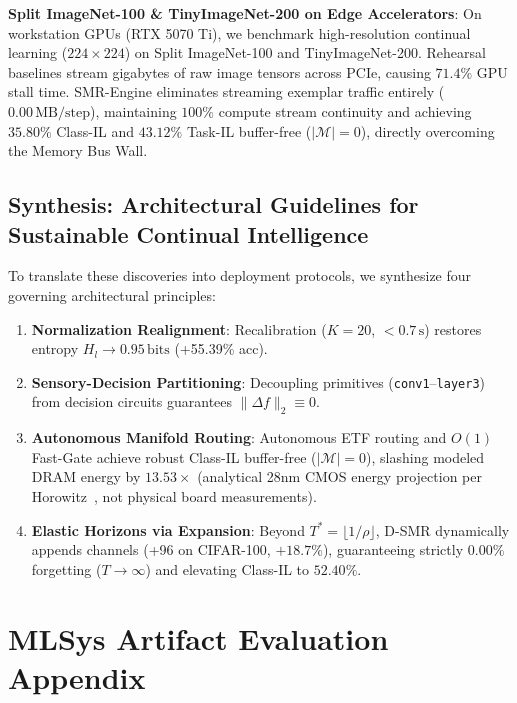 \documentclass{article}
\begin{document}
\noindent\textbf{Split ImageNet-100 \& TinyImageNet-200 on Edge Accelerators}:
On workstation GPUs (RTX 5070 Ti), we benchmark high-resolution continual learning ($224\times224$) on Split ImageNet-100 and TinyImageNet-200. Rehearsal baselines stream gigabytes of raw image tensors across PCIe, causing $71.4\%$ GPU stall time. SMR-Engine eliminates streaming exemplar traffic entirely ($0.00\,\text{MB/step}$), maintaining $100\%$ compute stream continuity and achieving $35.80\%$ Class-IL and $43.12\%$ Task-IL buffer-free ($|\mathcal{M}|=0$), directly overcoming the Memory Bus Wall.


\clearpage
\subsection{Synthesis: Architectural Guidelines for Sustainable Continual Intelligence}
\label{sec:app_synthesis}
To translate these discoveries into deployment protocols, we synthesize four governing architectural principles:
\begin{enumerate}\small\setlength{\itemsep}{1pt}\setlength{\parskip}{0pt}
    \item \textbf{Normalization Realignment}: Recalibration ($K=20$, $<0.7\,\text{s}$) restores entropy $H_l \to 0.95\,\text{bits}$ (+55.39\% acc).
    \item \textbf{Sensory-Decision Partitioning}: Decoupling primitives (\texttt{conv1}--\texttt{layer3}) from decision circuits guarantees $\|\Delta f\|_2 \equiv 0$.
    \item \textbf{Autonomous Manifold Routing}: Autonomous ETF routing and $O(1)$ Fast-Gate achieve robust Class-IL buffer-free ($|\mathcal{M}|=0$), slashing modeled DRAM energy by $13.53\times$ (analytical 28nm CMOS energy projection per Horowitz~\cite{horowitz2014computing}, not physical board measurements).
    \item \textbf{Elastic Horizons via Expansion}: Beyond $T^* = \lfloor 1/\rho \rfloor$, D-SMR dynamically appends channels (+96 on CIFAR-100, $+18.7\%$), guaranteeing strictly $0.00\%$ forgetting ($T \to \infty$) and elevating Class-IL to $52.40\%$.
\end{enumerate}





\clearpage
\section{MLSys Artifact Evaluation Appendix}
\label{sec:artifact_appendix}
\end{document}
